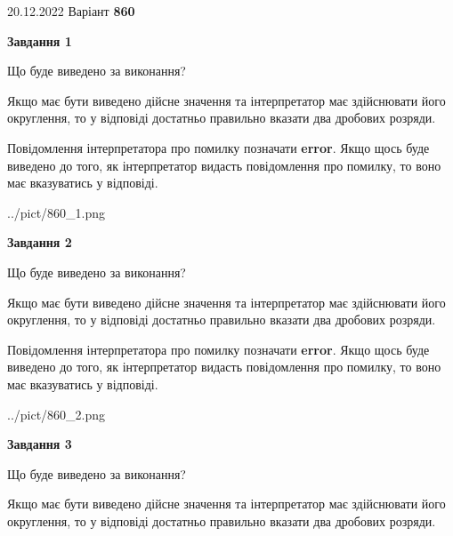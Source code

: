 \documentclass[12pt, ukrainian]{article}
\begin{document}
{20.12.2022 Варіант \No \textbf { 860 }\par}
{
\begin {Large}

{\begin {center}\textbf{Завдання 1}\end {center}}\par
Що буде виведено за виконання? \par

Якщо має бути виведено дійсне значення та інтерпретатор має здійснювати його округлення, 
то у відповіді достатньо правильно вказати два дробових розряди.

Повідомлення інтерпретатора про помилку позначати \textbf{error}.
Якщо щось буде виведено до того, як інтерпретатор видасть повідомлення про помилку, 
то воно має вказуватись у відповіді. \par

\begin{center}
	{../pict/860_1.png}
\end{center}
\newpage

{\begin {center}\textbf{Завдання 2}\end {center}}\par
Що буде виведено за виконання? \par

Якщо має бути виведено дійсне значення та інтерпретатор має здійснювати його округлення, 
то у відповіді достатньо правильно вказати два дробових розряди.

Повідомлення інтерпретатора про помилку позначати \textbf{error}.
Якщо щось буде виведено до того, як інтерпретатор видасть повідомлення про помилку, 
то воно має вказуватись у відповіді. \par

\begin{center}
	{../pict/860_2.png}
\end{center}
\newpage

{\begin {center}\textbf{Завдання 3}\end {center}}\par
Що буде виведено за виконання? \par

Якщо має бути виведено дійсне значення та інтерпретатор має здійснювати його округлення, 
то у відповіді достатньо правильно вказати два дробових розряди.


\end{Large}}
\end{document}

